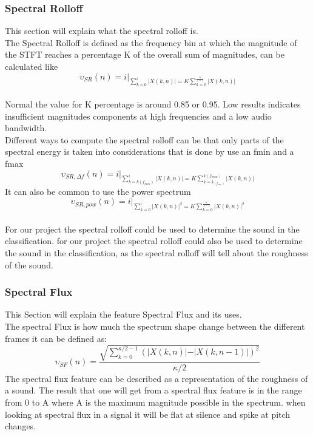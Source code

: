 \subsubsection{Spectral Rolloff}
This section will explain what the spectral rolloff is.\\
The Spectral Rolloff is defined as the frequency bin at which the magnitude of the STFT reaches a percentage K of the overall sum of magnitudes, can be calculated like\citep{ACA}\\
\begin{equation}\label{ eq:normal spectral rolloff}
	\upsilon_{SR}(n) = i \vert _{\displaystyle\sum_{k = 0}^i \vert X(k, n) \vert = K  \displaystyle\sum_{k = 0}^ {\frac{\kappa}{2-1}}\vert X(k, n) \vert}
\end{equation}
\\
Normal the value for K percentage is around 0.85 or 0.95. Low results indicates insufficient magnitudes components at high frequencies and a low audio bandwidth\citep{ACA}.\\
Different ways to compute the spectral rolloff can be that only parts of the spectral energy is taken into considerations that is done by use an fmin and a fmax\citep{ACA}
\begin{equation}\label{ eq: fmin and fmax spectral rolloff}
	\upsilon_{SR, \Delta f}(n) = i \vert _{\displaystyle\sum_{k = k(f_{min})}^i \vert X(k, n) \vert = K \displaystyle\sum_{k = k_(f_{min})}^ {k(f_{max})}\vert X(k, n) \vert}
\end{equation}
It can also be common to use the power spectrum
\begin{equation}\label{ eq:power spectral rolloff}
	\upsilon_{SR, pow}(n) = i \vert _{\displaystyle\sum_{k = 0}^i \vert X(k, n) \vert^2 = K \displaystyle\sum_{k= 0}^ {\frac{\kappa}{2-1}}\vert X(k, n) \vert^2}
\end{equation}
\\
For our project the spectral rolloff could be used to determine the sound in the classification. 
for our project the spectral rolloff could also be used to determine the sound in the classification, as the spectral rolloff will tell about the roughness of the sound. 

\subsubsection{Spectral Flux}
This Section will explain the feature Spectral Flux and its uses.\\
The spectral Flux is how much the spectrum shape change between the different frames it can be defined as\citep{ACA}:
\begin{equation}\label{Spectral Flux eq}
	\upsilon_{SF}(n) = \frac{\sqrt{\displaystyle\sum_{k=0}^{\kappa/2-1}(\vert X(k,n)\vert-\vert X(k,n-1)\vert)^2}}{\kappa/2}
\end{equation} 
The spectral flux feature can be described as a representation of the roughness of a sound. The result that one will get from a spectral flux feature is in the range from 0 to A where A is the maximum magnitude possible in the spectrum\citep{ACA}. when looking at spectral flux in a signal it will be flat at silence and spike at pitch changes\citep{ACA}.


